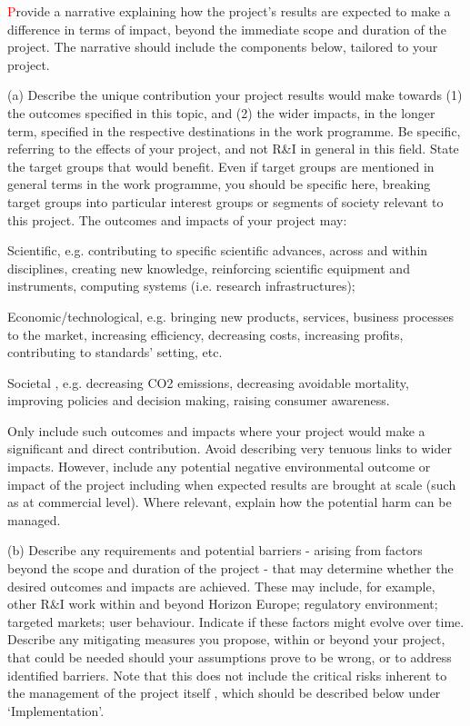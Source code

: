 \begin{draft}
{
\textcolor{red}
Provide a narrative explaining how the project's results are expected to make a
difference in terms of impact, beyond the immediate scope and duration of the
project. The narrative should include the components below, tailored to your
project.

(a)	Describe the unique contribution your project results would make towards (1) the outcomes specified in this topic, and (2) the wider impacts, in the longer term, specified in the respective destinations in the work programme.
	Be specific, referring to the effects of your project, and not R\&I in general in this field.
	State the target groups that would benefit. Even if target groups are mentioned in general terms in the work programme, you should be specific here, breaking target groups into particular interest groups or segments of society relevant to this project.
	The outcomes and impacts of your project may:
  \begin{compactitem}


\item	Scientific, e.g. contributing to specific scientific advances, across and within disciplines, creating new knowledge, reinforcing scientific equipment and instruments,  computing systems (i.e. research infrastructures);
\item	Economic/technological, e.g. bringing new products, services, business processes to the market, increasing efficiency, decreasing costs, increasing profits, contributing to standards’ setting,  etc.
\item	Societal , e.g. decreasing CO2 emissions, decreasing avoidable mortality,
improving policies and decision making, raising consumer awareness.
\end{compactitem}
Only include such outcomes and impacts where your project would make a
significant and direct contribution. Avoid describing very tenuous links to
wider impacts. However, include any potential negative environmental outcome or
impact of the project including when expected results are brought at scale (such
as at commercial level). Where relevant, explain how the potential harm can be
managed.

(b)	Describe any requirements and potential barriers - arising from factors beyond the scope and duration of the project - that may determine whether the desired outcomes and impacts are achieved. These may include, for example, other R\&I work within and beyond Horizon Europe; regulatory environment; targeted markets; user behaviour. Indicate if these factors might evolve over time. Describe any mitigating measures you propose, within or beyond your project, that could be needed should your assumptions prove to be wrong, or to address identified barriers.
	Note that this does not include the critical risks inherent to the management
  of the project itself , which should be described below under
  ‘Implementation’.

}
\end{draft}
